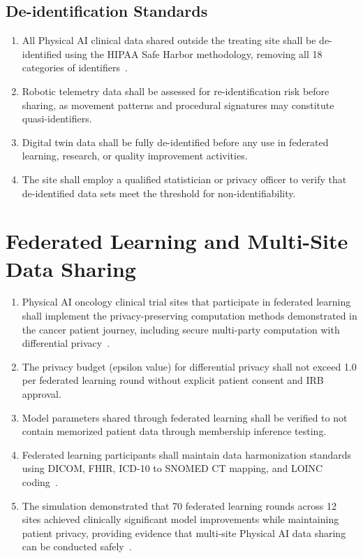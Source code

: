 \documentclass[11pt,letterpaper]{article}
\begin{document}
\subsection{De-identification Standards}

\begin{enumerate}[label=(\alph*)]
\item All Physical AI clinical data shared outside the treating site shall be
  de-identified using the HIPAA Safe Harbor methodology, removing all 18
  categories of identifiers~\cite{cfr50adapt}.

\item Robotic telemetry data shall be assessed for re-identification risk
  before sharing, as movement patterns and procedural signatures may
  constitute quasi-identifiers.

\item Digital twin data shall be fully de-identified before any use in
  federated learning, research, or quality improvement activities.

\item The site shall employ a qualified statistician or privacy officer to
  verify that de-identified data sets meet the threshold for non-identifiability.
\end{enumerate}

\section{Federated Learning and Multi-Site\\Data Sharing}

\begin{enumerate}[label=(\alph*)]
\item Physical AI oncology clinical trial sites that participate in federated
  learning shall implement the privacy-preserving computation methods
  demonstrated in the cancer patient journey, including secure multi-party
  computation with differential privacy~\cite{patientjourney2026}.

\item The privacy budget (epsilon value) for differential privacy shall not
  exceed 1.0 per federated learning round without explicit patient consent and
  IRB approval.

\item Model parameters shared through federated learning shall be verified to
  not contain memorized patient data through membership inference testing.

\item Federated learning participants shall maintain data harmonization
  standards using DICOM, FHIR, ICD-10 to SNOMED CT mapping, and LOINC
  coding~\cite{iche6r3adapt}.

\item The simulation demonstrated that 70 federated learning rounds across 12
  sites achieved clinically significant model improvements while maintaining
  patient privacy, providing evidence that multi-site Physical AI data sharing
  can be conducted safely~\cite{patientjourney2026}.
\end{enumerate}
\end{document}
